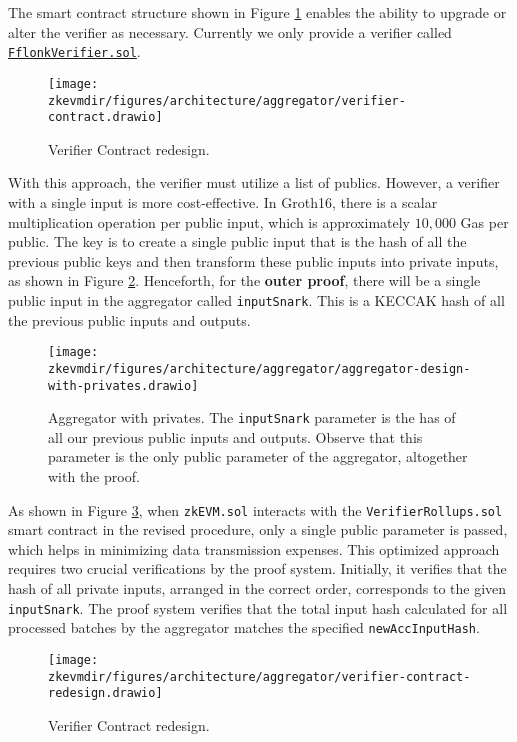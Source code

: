The smart contract structure shown in Figure \ref{fig:verifier-smart-contract} enables the ability to upgrade or alter the verifier as necessary. Currently we only provide a verifier called \href{https://github.com/0xPolygonHermez/zkevm-contracts/blob/main/contracts/verifiers/FflonkVerifier.sol}{\texttt{FflonkVerifier.sol}}.

\begin{figure}[h]
\centering
\texttt{[image: \\zkevmdir/figures/architecture/aggregator/verifier-contract.drawio]}
\caption{Verifier Contract redesign.}
\label{fig:verifier-smart-contract}
\end{figure}


With this approach, the verifier must utilize a list of publics. However, a verifier with a single input is more cost-effective. In Groth16, there is a scalar multiplication operation per public input, which is approximately $10,000$ Gas per public. The key is to create a single public input that is the hash of all the previous public keys and then transform these public inputs into private inputs, as shown in Figure \ref{fig:aggregator-with-privates}. Henceforth, for the \textbf{outer proof}, there will be a single public input in the aggregator called \texttt{inputSnark}. This is a KECCAK hash of all the previous public inputs and outputs.


\begin{figure}[h]
\centering
\texttt{[image: \\zkevmdir/figures/architecture/aggregator/aggregator-design-with-privates.drawio]}
\caption{Aggregator with privates. The \texttt{inputSnark} parameter is the has of all our previous public inputs and outputs. Observe that this parameter is the only public parameter of the aggregator, altogether with the proof. }
\label{fig:aggregator-with-privates}
\end{figure}


As shown in Figure \ref{fig:verifier-smart-contract-redesign}, when \texttt{zkEVM.sol} interacts with the \texttt{VerifierRollups.sol} smart contract in the revised procedure, only a single public parameter is passed, which helps in minimizing data transmission expenses. This optimized approach requires two crucial verifications by the proof system. Initially, it verifies that the hash of all private inputs, arranged in the correct order, corresponds to the given \texttt{inputSnark}. The proof system verifies that the total input hash calculated for all processed batches by the aggregator matches the specified \texttt{newAccInputHash}.


\begin{figure}[h]
\centering
\texttt{[image: \\zkevmdir/figures/architecture/aggregator/verifier-contract-redesign.drawio]}
\caption{Verifier Contract redesign.}
\label{fig:verifier-smart-contract-redesign}
\end{figure}
